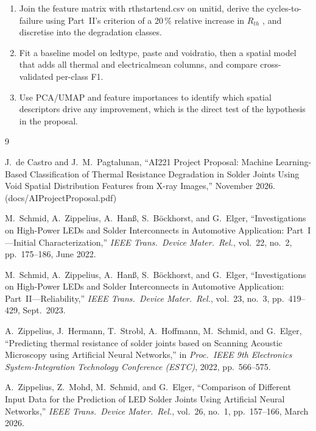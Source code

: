 \documentclass[11pt,a4paper]{article}
\newcommand{\code}[1]{{\ttfamily\def\_{\textunderscore\allowbreak}#1}}
\begin{document}
\begin{enumerate}[nosep]
  \item Join the feature matrix with \code{rth\_start\_end.csv} on \code{unit\_id}, derive the
        cycles-to-failure using Part~II's criterion of a 20\,\% relative increase in $R_{th}$
        \cite{part2}, and discretise into the degradation classes.
  \item Fit a baseline model on \code{led\_type}, \code{paste} and \code{void\_ratio}, then a
        spatial model that adds all \code{thermal\_*} and \code{electrical\_mean\_*} columns,
        and compare cross-validated per-class F1.
  \item Use PCA/UMAP and feature importances to identify which spatial descriptors drive any
        improvement, which is the direct test of the hypothesis in the proposal.
\end{enumerate}

\begin{thebibliography}{9}

J.~de Castro and J.~M.~Pagtalunan, ``AI221 Project Proposal: Machine Learning-Based
Classification of Thermal Resistance Degradation in Solder Joints Using Void Spatial
Distribution Features from X-ray Images,'' November 2026.
(\code{docs/AI\_221\_Project\_Proposal.pdf})

M.~Schmid, A.~Zippelius, A.~Han\ss{}, S.~B\"ockhorst, and G.~Elger, ``Investigations on
High-Power LEDs and Solder Interconnects in Automotive Application: Part~I---Initial
Characterization,'' \emph{IEEE Trans.\ Device Mater.\ Rel.}, vol.~22, no.~2, pp.~175--186,
June 2022.

M.~Schmid, A.~Zippelius, A.~Han\ss{}, S.~B\"ockhorst, and G.~Elger, ``Investigations on
High-Power LEDs and Solder Interconnects in Automotive Application: Part~II---Reliability,''
\emph{IEEE Trans.\ Device Mater.\ Rel.}, vol.~23, no.~3, pp.~419--429, Sept.\ 2023.

A.~Zippelius, J.~Hermann, T.~Strobl, A.~Hoffmann, M.~Schmid, and G.~Elger, ``Predicting thermal
resistance of solder joints based on Scanning Acoustic Microscopy using Artificial Neural
Networks,'' in \emph{Proc.\ IEEE 9th Electronics System-Integration Technology Conference
(ESTC)}, 2022, pp.~566--575.

A.~Zippelius, Z.~Mohd, M.~Schmid, and G.~Elger, ``Comparison of Different Input Data for the
Prediction of LED Solder Joints Using Artificial Neural Networks,'' \emph{IEEE Trans.\ Device
Mater.\ Rel.}, vol.~26, no.~1, pp.~157--166, March 2026.

\end{thebibliography}
\end{document}
